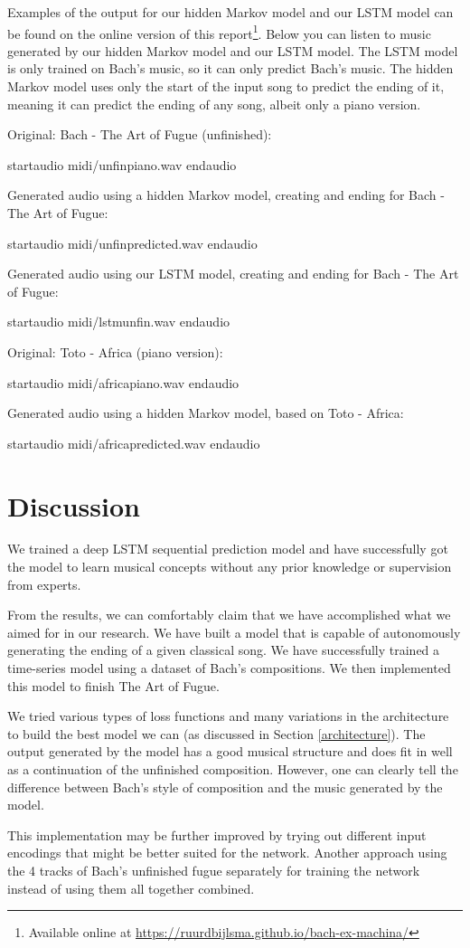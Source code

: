 \documentclass[11pt, twocolumn]{article}
\begin{document}
\ifpdf
Examples of the output for our hidden Markov model and our LSTM model can be found on the online version of this report\footnote{Available online at \url{https://ruurdbijlsma.github.io/bach-ex-machina/}}.
\else
Below you can listen to music generated by our hidden Markov model and our LSTM model. The LSTM model is only trained on Bach's music, so it can only predict Bach's music. The hidden Markov model uses only the start of the input song to predict the ending of it, meaning it can predict the ending of any song, albeit only a piano version.

Original: Bach - The Art of Fugue (unfinished):

startaudio midi/unfinpiano.wav endaudio

Generated audio using a hidden Markov model, creating and ending for Bach - The Art of Fugue:

startaudio midi/unfinpredicted.wav endaudio

Generated audio using our LSTM model, creating and ending for Bach - The Art of Fugue:

startaudio midi/lstmunfin.wav endaudio

Original: Toto - Africa (piano version):

startaudio midi/africapiano.wav endaudio

Generated audio using a hidden Markov model, based on Toto - Africa:

startaudio midi/africapredicted.wav endaudio

\fi

\section{Discussion}
 We trained a deep LSTM sequential prediction model and have successfully got the model to learn musical concepts without any prior knowledge or supervision from experts.

From the results, we can comfortably claim that we have accomplished what we aimed for in our research. We have built a model that is capable of autonomously generating the ending of a given classical song. We have successfully trained a time-series model using a dataset of Bach's compositions. We then implemented this model to finish The Art of Fugue.

We tried various types of loss functions and many variations in the architecture to build the best model we can (as discussed in Section \ref{architecture}). The output generated by the model has a good musical structure and does fit in well as a continuation of the unfinished composition. However, one can clearly tell the difference between Bach's style of composition and the music generated by the model.

This implementation may be further improved by trying out different input encodings that might be better suited for the network. Another approach using the 4 tracks of Bach's unfinished fugue separately for training the network instead of using them all together combined.



\end{document}
